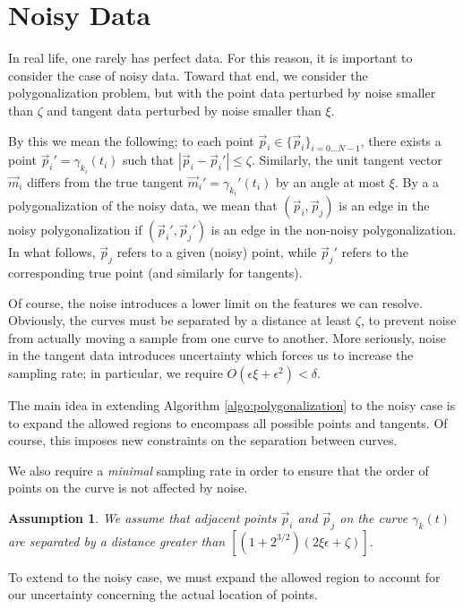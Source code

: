 \documentclass{article}
\newtheorem{assumption}{Assumption}
\numberwithin{cntr}{section}
\numberwithin{equation}{section}
\newcommand{\abs}[1]{\left| #1 \right|}%
\newcommand{\vp}[0]{{\vec{p}}}
\newcommand{\vm}[0]{{\vec{m}}}
\newcommand{\OtoN}{{0 \ldots N-1}}
\newcommand{\pointData}{{ \{ \vp_{i} \}_{i=\OtoN} }}
\newcommand{\curvesep}{{\delta}}
\newcommand{\pointNoise}{{\zeta}}
\newcommand{\tanNoise}{{\xi}}
\begin{document}
\section{Noisy Data}

In real life, one rarely has perfect data. For this reason, it is important to consider the case of noisy data. Toward that end, we consider the polygonalization problem, but with the point data perturbed by noise smaller than $\pointNoise$ and tangent data perturbed by noise smaller than $\tanNoise$.

By this we mean the following; to each point $\vp_{i} \in \pointData$, there exists a point $\vp_{i}' = \gamma_{k_{i}}(t_{i})$ such that $\abs{\vp_{i}-\vp_{i}'} \leq \pointNoise$. Similarly, the unit tangent vector $\vm_{i}$ differs from the true tangent $\vm_{i}' = \gamma_{k_{i}}'(t_{i})$ by an angle at most $\tanNoise$. By a a polygonalization of the noisy data, we mean that $(\vp_{i},\vp_{j})$ is an edge in the noisy polygonalization if $(\vp_{i}',\vp_{j}')$ is an edge in the non-noisy polygonalization. In what follows, $\vp_{j}$ refers to a given (noisy) point, while $\vp_{j}'$ refers to the corresponding true point (and similarly for tangents).

Of course, the noise introduces a lower limit on the features we can resolve. Obviously, the curves must be separated by a distance at least $\pointNoise$, to prevent noise from actually moving a sample from one curve to another. More seriously, noise in the tangent data introduces uncertainty which forces us to increase the sampling rate; in particular, we require $O(\epsilon \tanNoise + \epsilon^{2}) < \curvesep$.

The main idea in extending Algorithm \ref{algo:polygonalization} to the noisy case is to expand the allowed regions to encompass all possible points and tangents. Of course, this imposes new constraints on the separation between curves.

We also require a \emph{minimal} sampling rate in order to ensure that the order of points on the curve is not affected by noise.

\begin{assumption}
  \label{ass:minSamplingRateNoisy}
  We assume that adjacent points $\vp_{i}$ and $\vp_{j}$ on the curve $\gamma_{k}(t)$ are separated by a distance greater than $[(1+2^{3/2})(2 \tanNoise \epsilon + \pointNoise)]$.
\end{assumption}

To extend to the noisy case, we must expand the allowed region to account for our uncertainty concerning the actual location of points.
\end{document}
